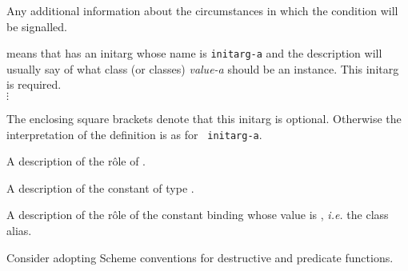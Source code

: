 \begin{optDefinition}
\begin{initoptions}
\end{initoptions}
%
\remarks%
Any additional information about the circumstances in which the
condition will be signalled.
%
%
\begin{initoptions}
    \item[initarg-a, value-a] means that {\tt <a-class>} has an
    initarg whose name is {\tt initarg-a} and the description will usually
    say of what class (or classes) {\em value-a} should be an instance.
    This initarg is required.\\ $\vdots$
    \item[{\tt[}initarg-n, value-n{\tt]}]
    The enclosing square brackets denote that this initarg is optional.
    Otherwise the interpretation of the definition is as for {\tt
        initarg-a}.
\end{initoptions}
%
\remarks%
A description of the r\^ole of {\tt <a-class>}.

%
\remarks%
A description of the constant of type .

%
\remarks%
A description of the r\^ole of the constant binding whose value is
, {\em i.e.} the class alias.

\end{optDefinition}
%
%
\begin{optPrivate}
    Consider adopting Scheme conventions for destructive and predicate
    functions.
\end{optPrivate}
%
